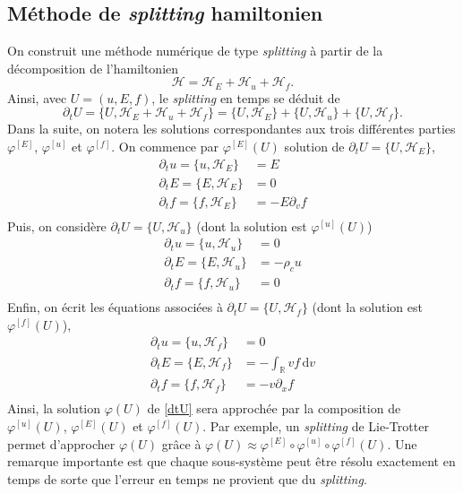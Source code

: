 \subsection{Méthode de \emph{splitting} hamiltonien}\label{ssec:splitting}

On construit une méthode numérique de type \emph{splitting} à partir de la décomposition de l'hamiltonien
$$
  \mathcal{H} = \mathcal{H}_E +\mathcal{H}_u + \mathcal{H}_f. 
$$
Ainsi, avec $U=(u, E, f)$, le \emph{splitting} en temps se déduit de 
\begin{equation}
\label{dtU}
  \partial_t U = \{ U, \mathcal{H}_E +\mathcal{H}_u + \mathcal{H}_f \} = \{ U, \mathcal{H}_E  \}+\{ U, \mathcal{H}_u  \}+\{ U,  \mathcal{H}_f \}.
\end{equation}
Dans la suite, on notera les solutions correspondantes aux trois différentes parties $\varphi^{[E]}$, $\varphi^{[u]}$ et $\varphi^{[f]}$. On commence par  $\varphi^{[E]}(U)$ solution de $\partial_t U = \{ U, \mathcal{H}_E  \}$,  
\begin{equation}
  \begin{aligned}
    \partial_t u = \{ u, \mathcal{H}_E \} &= E \\
    \partial_t E = \{ E, \mathcal{H}_E \} &=  0 \\
    \partial_t f = \{ f, \mathcal{H}_E \} &=  -E\partial_v f \\
  \end{aligned}
  \label{eq:varphi:E}
\end{equation}
Puis, on considère  $\partial_t U = \{ U, \mathcal{H}_u  \}$ (dont la solution est $\varphi^{[u]}(U)$)
\begin{equation}
  \begin{aligned}
    \partial_t u = \{ u, \mathcal{H}_u \} &=  0 \\
    \partial_t E = \{ E, \mathcal{H}_u \} &=  - \rho_c u \\
    \partial_t f = \{ f, \mathcal{H}_u \} &=  0 \\
  \end{aligned}
  \label{eq:varphi:u}
\end{equation}
Enfin, on écrit les équations associées à  $\partial_t U = \{ U, \mathcal{H}_f  \}$ (dont la solution est $\varphi^{[f]}(U)$), 
\begin{equation}
  \begin{aligned}
    \partial_t u = \{ u, \mathcal{H}_f \} &=  0 \\
    \partial_t E = \{ E, \mathcal{H}_f \} &=  - \int_{\mathbb{R}} vf\,\mathrm{d}{v} \\
    \partial_t f = \{ f, \mathcal{H}_f \} &=  -v\partial_x f \\
  \end{aligned}
  \label{eq:varphi:f}
\end{equation}
Ainsi, la solution $\varphi(U)$ de \eqref{dtU} sera approchée par la composition de $\varphi^{[u]}(U)$, $\varphi^{[E]}(U)$ et $\varphi^{[f]}(U)$. Par exemple, un \emph{splitting} de Lie-Trotter permet d'approcher $\varphi(U)$ grâce à $\varphi(U)\approx \varphi^{[E]}\circ  \varphi^{[u]}\circ  \varphi^{[f]}(U)$. Une remarque importante est que chaque sous-système peut être résolu exactement en temps de sorte que l'erreur en temps ne provient que du \emph{splitting}.  


